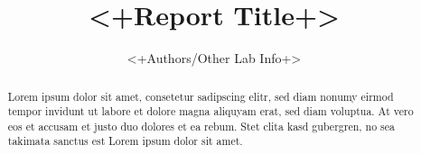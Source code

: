 \documentclass[a4paper,titlepage]{article}
\begin{document}
	\title{<+Report Title+>}
	\author{<+Authors/Other Lab Info+>}
	\maketitle

	\begin{abstract}
	Lorem ipsum dolor sit amet, consetetur sadipscing elitr, sed diam nonumy eirmod
	tempor invidunt ut labore et dolore magna aliquyam erat, sed diam voluptua. At
	vero eos et accusam et justo duo dolores et ea rebum. Stet clita kasd gubergren,
	no sea takimata sanctus est Lorem ipsum dolor sit amet.
	\end{abstract}

	\tableofcontents
	\listoftables
	\listoffigures

	
	
	
	
\end{document}
